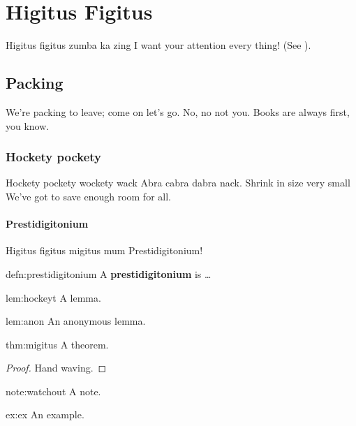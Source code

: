 \part{Higitus Figitus}

Higitus figitus zumba ka zing
I want your attention every thing!
(See \cite{sword}).

\chapter{Packing}

We're packing to leave; come on let's go.
No, no not you.
Books are always first, you know.

\section{Hockety pockety}

Hockety pockety wockety wack
Abra cabra dabra nack.
Shrink in size very small
We've got to save enough room for all.

\subsection{Prestidigitonium}

Higitus figitus migitus mum
Prestidigitonium!

\begin{defn}[Prestidigitonium]{defn:prestidigitonium}
        A \textbf{prestidigitonium} is \ldots
\end{defn}

\begin{lem}{lem:hockeyt}
	A lemma.
\end{lem}

\begin{lem}{lem:anon}
	An anonymous lemma.
\end{lem}

\begin{theo}{thm:migitus}
	A theorem.
\end{theo}
\begin{proof}
	Hand waving.
\end{proof}

\begin{note}{note:watchout}
	A note.
\end{note}

\begin{exmp}{ex:ex}
	An example.
\end{exmp}

